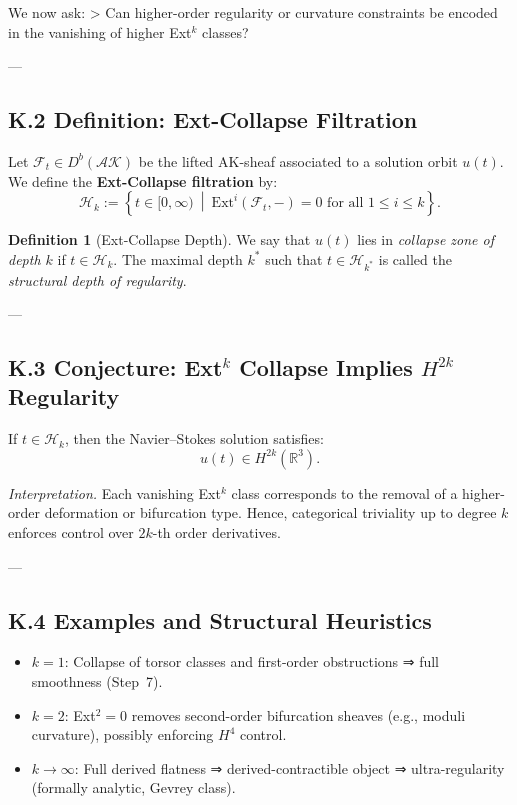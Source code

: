 \documentclass[11pt]{article}
\theoremstyle{definition}
\newtheorem{definition}[theorem]{Definition}
\begin{document}
We now ask:
> Can higher-order regularity or curvature constraints be encoded in the vanishing of higher Ext$^k$ classes?

---

\subsection*{K.2 Definition: Ext-Collapse Filtration}

Let \( \mathcal{F}_t \in D^b(\mathcal{AK}) \) be the lifted AK-sheaf associated to a solution orbit \( u(t) \).  
We define the \textbf{Ext-Collapse filtration} by:
\[
\mathcal{H}_k := \left\{ t \in [0, \infty) \ \middle| \ \mathrm{Ext}^i(\mathcal{F}_t, -) = 0 \text{ for all } 1 \leq i \leq k \right\}.
\]

\begin{definition}[Ext-Collapse Depth]
We say that \( u(t) \) lies in \emph{collapse zone of depth \( k \)} if \( t \in \mathcal{H}_k \).  
The maximal depth \( k^\ast \) such that \( t \in \mathcal{H}_{k^\ast} \) is called the \emph{structural depth of regularity}.
\end{definition}

---

\subsection*{K.3 Conjecture: Ext$^k$ Collapse Implies $H^{2k}$ Regularity}

\begin{conjecture}
If \( t \in \mathcal{H}_k \), then the Navier--Stokes solution satisfies:
\[
u(t) \in H^{2k}(\mathbb{R}^3).
\]
\end{conjecture}

\textit{Interpretation.}  
Each vanishing Ext$^k$ class corresponds to the removal of a higher-order deformation or bifurcation type.  
Hence, categorical triviality up to degree \( k \) enforces control over \( 2k \)-th order derivatives.

---

\subsection*{K.4 Examples and Structural Heuristics}

\begin{itemize}
  \item \( k = 1 \): Collapse of torsor classes and first-order obstructions ⇒ full smoothness (Step~7).
  \item \( k = 2 \): Ext$^2 = 0$ removes second-order bifurcation sheaves (e.g., moduli curvature), possibly enforcing $H^4$ control.
  \item \( k \to \infty \): Full derived flatness ⇒ derived-contractible object ⇒ ultra-regularity (formally analytic, Gevrey class).
\end{itemize}
\end{document}
